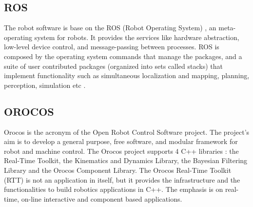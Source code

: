 \documentclass[conference]{IEEEtran}
\begin{document}
%
\subsection{ROS}\label{subsec:ros}
The robot software is base on the ROS (Robot Operating System) \cite{ros_components}, an meta-operating system for robots. It provides the services like hardware abstraction, low-level device control, and message-passing between processes.
ROS is composed by the operating system commands that manage the packages, and a suite of user contributed packages (organized into sets called stacks) that implement functionality such as simultaneous localization and mapping, planning, perception, simulation etc \cite{ros_gentle_introduction}. 

%
\subsection{OROCOS}\label{subsec:orocos}
Orocos \cite{orocos_Project_IEEE} is the acronym of the Open Robot Control Software project. The project's aim is to develop a general purpose, free software, and modular framework for robot and machine control. The Orocos project supports 4 C++ libraries \cite{orocos_manual}: the Real-Time Toolkit, the Kinematics and Dynamics Library, the Bayesian Filtering Library and the Orocos Component Library.
The Orocos Real-Time Toolkit (RTT) is not an application in itself, but it provides the infrastructure and the functionalities to build robotics applications in C++.
The emphasis is on real-time, on-line interactive and component based applications. %
\end{document}
